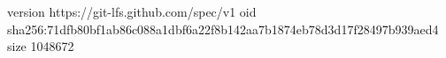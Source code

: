 version https://git-lfs.github.com/spec/v1
oid sha256:71dfb80bf1ab86c088a1dbf6a22f8b142aa7b1874eb78d3d17f28497b939aed4
size 1048672
